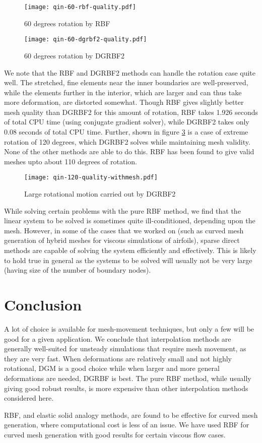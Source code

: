 \documentclass[11pt, ms, onehalfspacing]{ncsuthesis}
\begin{document}
\begin{figure}
	\centering
	\texttt{[image: qin-60-rbf-quality.pdf]}
	\caption{60 degrees rotation by RBF}
	\label{fig:qin-60-rbf}
\end{figure}

\begin{figure}
	\centering
	\texttt{[image: qin-60-dgrbf2-quality.pdf]}
	\caption{60 degrees rotation by DGRBF2}
	\label{fig:qin-60-dgrbf2}
\end{figure}

We note that the RBF and DGRBF2 methods can handle the rotation case quite well. The stretched, fine elements near the inner boundaries are well-preserved, while the elements further in the interior, which are larger and can thus take more deformation, are distorted somewhat. Though RBF gives slightly better mesh quality than DGRBF2 for this amount of rotation, RBF takes 1.926 seconds of total CPU time (using conjugate gradient solver), while DGRBF2 takes only 0.08 seconds of total CPU time. Further, shown in figure \ref{fig:qin-dgrbf2-120} is a case of extreme rotation of 120 degrees, which DGRBF2 solves while maintaining mesh validity. None of the other methods are able to do this. RBF has been found to give valid meshes upto about 110 degrees of rotation.
\begin{figure}
	\centering
	\texttt{[image: qin-120-quality-withmesh.pdf]}
	\caption{Large rotational motion carried out by DGRBF2}
	\label{fig:qin-dgrbf2-120}
\end{figure}

While solving certain problems with the pure RBF method, we find that the linear system to be solved is sometimes quite ill-conditioned, depending upon the mesh. However, in some of the cases that we worked on (such as curved mesh generation of hybrid meshes for viscous simulations of airfoils), sparse direct methods are capable of solving the system efficiently and effectively. This is likely to hold true in general as the systems to be solved will usually not be very large (having size of the number of boundary nodes).

\FloatBarrier

\chapter{Conclusion}

A lot of choice is available for mesh-movement techniques, but only a few will be good for a given application. We conclude that interpolation methods are generally well-suited for unsteady simulations that require mesh movement, as they are very fast. When deformations are relatively small and not highly rotational, DGM is a good choice while when larger and more general deformations are needed, DGRBF is best. The pure RBF method, while usually giving good robust results, is more expensive than other interpolation methods considered here. 

RBF, and elastic solid analogy methods, are found to be effective for curved mesh generation, where computational cost is less of an issue. We have used RBF for curved mesh generation with good results for certain viscous flow cases.


\end{document}
